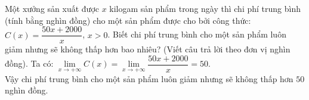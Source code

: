 \begin{bt}%
	Một xưởng sản xuất được $x$ kilogam sản phẩm trong ngày thì chi phí trung bình (tính bằng nghìn đồng) cho một sản phẩm được cho bởi công thức: $C(x)=\dfrac{50x+2000}{x}$, $x>0$. Biết chi phí trung bình cho một sản phẩm luôn giảm nhưng sẽ không thấp hơn bao nhiêu? (Viết câu trả lời theo đơn vị nghìn đồng).
	\loigiai
	{Ta có: $\lim\limits_{x\to +\infty} C(x)=\lim\limits_{x\to +\infty}\dfrac{50x+2000}{x}=50$.\\
		Vậy chi phí trung bình cho một sản phẩm luôn giảm nhưng sẽ không thấp hơn $50$ nghìn đồng.
	}
\end{bt}

